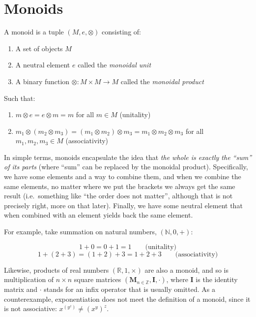 \documentclass[
]{book}
\providecommand{\tightlist}{%
  \setlength{\itemsep}{0pt}\setlength{\parskip}{0pt}}
\theoremstyle{definition}
\theoremstyle{definition}
\theoremstyle{definition}
\theoremstyle{definition}
\theoremstyle{remark}
\begin{document}
\hypertarget{monoids}{%
\section{Monoids}\label{monoids}}

A monoid is a tuple \((M, e, \otimes)\) consisting of:

\begin{enumerate}
\def\labelenumi{\alph{enumi}.}
\tightlist
\item
  A set of objects \(M\)
\item
  A neutral element \(e\) called the \emph{monoidal unit}
\item
  A binary function \(\otimes: M \times M \to M\) called the \emph{monoidal product}
\end{enumerate}

Such that:

\begin{enumerate}
\def\labelenumi{\arabic{enumi}.}
\tightlist
\item
  \(m \otimes e = e \otimes m = m\) for all \(m \in M\) (unitality)
\item
  \(m_1 \otimes (m_2 \otimes m_3) = (m_1 \otimes m_2) \otimes m_3 = m_1 \otimes m_2 \otimes m_3\) for all \(m_1, m_2, m_3 \in M\) (associativity)
\end{enumerate}

In simple terms, monoids encapsulate the idea that \emph{the whole is exactly the ``sum'' of its parts} (where ``sum'' can be replaced by the monoidal product). Specifically, we have some elements and a way to combine them, and when we combine the same elements, no matter where we put the brackets we always get the same result (i.e.~something like ``the order does not matter'', although that is not precisely right, more on that later). Finally, we have some neutral element that when combined with an element yields back the same element.

For example, take summation on natural numbers, \((\mathbb{N}, 0, +)\):

\[1 + 0 = 0 + 1 = 1 \qquad \text{(unitality)}\]
\[1 + (2 + 3) = (1 + 2) + 3 = 1 + 2 + 3 \qquad \text{(associativity)}\]

Likewise, products of real numbers \((\mathbb{R}, 1, \times)\) are also a monoid, and so is multiplication of \(n \times n\) square matrices \((\mathbf{M}_{n \in \mathbb{Z}}, \mathbf{I}, \cdot)\), where \(\mathbf{I}\) is the identity matrix and \(\cdot\) stands for an infix operator that is usually omitted. As a counterexample, exponentiation does not meet the definition of a monoid, since it is not associative: \(x^{(y^z)} \neq (x^y)^z\).
\end{document}
